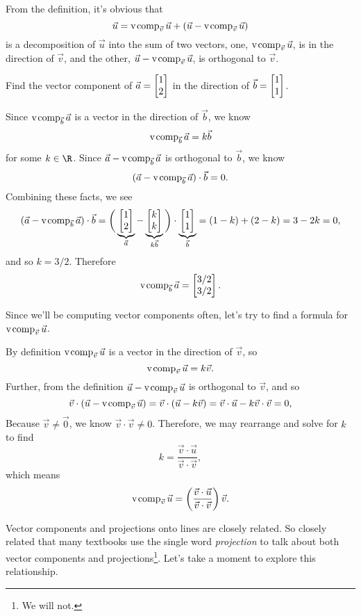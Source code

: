 
From the definition, it's obvious that
\[
	\vec u=\operatorname{v\hspace{1pt}comp}_{\vec v}\vec u + (\vec u-\operatorname{v\hspace{1pt}comp}_{\vec v}\vec u)
\]
is a decomposition of $\vec u$ into the sum of two vectors, one, $\operatorname{v\hspace{1pt}comp}_{\vec v}\vec u$, is in the direction of $\vec v$,
and the other, $\vec u-\operatorname{v\hspace{1pt}comp}_{\vec v}\vec u$, is orthogonal to $\vec v$.

\begin{example}
	Find the vector component of $\vec a=\mat{1\\2}$ in the direction of $\vec b=\mat{1\\1}$.

	Since $\operatorname{v\hspace{1pt}comp}_{\vec b}\vec a$ is a vector in the direction of $\vec b$, we know
	\[
		\operatorname{v\hspace{1pt}comp}_{\vec b}\vec a = k\vec b
	\]
	for some $k\in \R$. Since $\vec a-\operatorname{v\hspace{1pt}comp}_{\vec b}\vec a$ is orthogonal to $\vec b$, we know
	\[
		(\vec a-\operatorname{v\hspace{1pt}comp}_{\vec b}\vec a)\cdot \vec b=0.
	\]
	Combining these facts, we see
	\[
		(\vec a-\Vcomp_{\vec b}\vec a)\cdot \vec b = \bigg(\underbrace{\mat{1\\2}}_{\vec a}-\underbrace{\mat{k\\k}}_{k\vec b}\bigg)\cdot 
		\underbrace{\mat{1\\1}}_{\vec b} =(1-k)+(2-k)=3-2k=0,
	\]
	and so $k=3/2$. Therefore
	\[
		\Vcomp_{\vec b}\vec a=\mat{3/2\\3/2}.
	\]
\end{example}

Since we'll be computing vector components often, let's try to find a formula for $\operatorname{v\hspace{1pt}comp}_{\vec v}\vec u$.

By definition $\operatorname{v\hspace{1pt}comp}_{\vec v}\vec u$ is a vector in the direction of $\vec v$, so
\[
	\operatorname{v\hspace{1pt}comp}_{\vec v}\vec u = k\vec v.
\]
Further, from the definition $\vec u-\operatorname{v\hspace{1pt}comp}_{\vec v}\vec u$ is orthogonal to $\vec v$, and so
\[
	\vec v\cdot (\vec u-\operatorname{v\hspace{1pt}comp}_{\vec v}\vec u) = \vec v\cdot (\vec u-k\vec v)=\vec v\cdot \vec u-k\vec v\cdot \vec v=0,
\]
Because $\vec v\neq \vec 0$, we know $\vec v\cdot \vec v\neq 0$. Therefore, we may rearrange and solve for $k$ to find
\[
	k=\frac{\vec v\cdot \vec u}{\vec v\cdot \vec v},
\]
which means
\[
	\operatorname{v\hspace{1pt}comp}_{\vec v}\vec u = \left(\frac{\vec v\cdot \vec u}{\vec v\cdot \vec v}\right)\vec v.
\]


Vector components and projections onto lines are closely related. So closely related that many textbooks
use the single word \emph{projection} to talk about both vector components and projections\footnote{ We will not.}. Let's take a moment
to explore this relationship.

